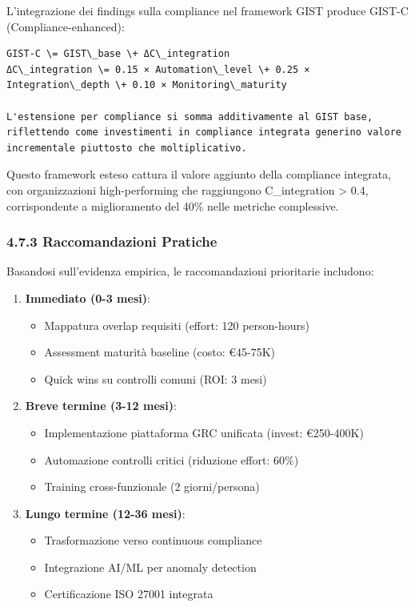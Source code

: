 \documentclass{report}
\providecommand{\tightlist}{%
  \setlength{\itemsep}{0pt}\setlength{\parskip}{0pt}
}
\begin{document}
L'integrazione dei findings sulla compliance nel framework GIST produce
GIST-C (Compliance-enhanced):

\begin{verbatim}
GIST-C \= GIST\_base \+ ΔC\_integration  
ΔC\_integration \= 0.15 × Automation\_level \+ 0.25 × Integration\_depth \+ 0.10 × Monitoring\_maturity

L'estensione per compliance si somma additivamente al GIST base, riflettendo come investimenti in compliance integrata generino valore incrementale piuttosto che moltiplicativo.
\end{verbatim}

Questo framework esteso cattura il valore aggiunto della compliance
integrata, con organizzazioni high-performing che raggiungono
C\_integration \textgreater{} 0.4, corrispondente a miglioramento del
40\% nelle metriche complessive.

\subsubsection{4.7.3 Raccomandazioni
Pratiche}\label{raccomandazioni-pratiche}

Basandosi sull'evidenza empirica, le raccomandazioni prioritarie
includono:

\begin{enumerate}
\def\labelenumi{\arabic{enumi}.}
\tightlist
\item
  \textbf{Immediato (0-3 mesi)}:

  \begin{itemize}
  \tightlist
  \item
    Mappatura overlap requisiti (effort: 120 person-hours)
  \item
    Assessment maturità baseline (costo: €45-75K)
  \item
    Quick wins su controlli comuni (ROI: 3 mesi)
  \end{itemize}
\item
  \textbf{Breve termine (3-12 mesi)}:

  \begin{itemize}
  \tightlist
  \item
    Implementazione piattaforma GRC unificata (invest: €250-400K)
  \item
    Automazione controlli critici (riduzione effort: 60\%)
  \item
    Training cross-funzionale (2 giorni/persona)
  \end{itemize}
\item
  \textbf{Lungo termine (12-36 mesi)}:

  \begin{itemize}
  \tightlist
  \item
    Trasformazione verso continuous compliance
  \item
    Integrazione AI/ML per anomaly detection
  \item
    Certificazione ISO 27001 integrata
  \end{itemize}
\end{enumerate}
\end{document}
